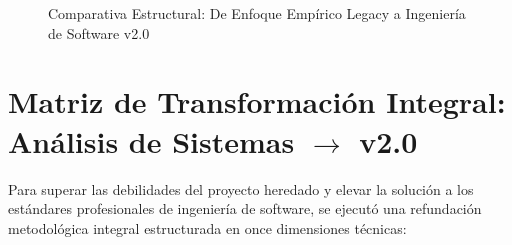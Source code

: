 \begin{figure}[H]
\caption{Comparativa Estructural: De Enfoque Empírico Legacy a Ingeniería de Software v2.0}
\label{fig:legacy_vs_modern}
\end{figure}

\section{Matriz de Transformación Integral: Análisis de Sistemas $\rightarrow$ v2.0}
Para superar las debilidades del proyecto heredado y elevar la solución a los estándares profesionales de ingeniería de software, se ejecutó una refundación metodológica integral estructurada en once dimensiones técnicas:

